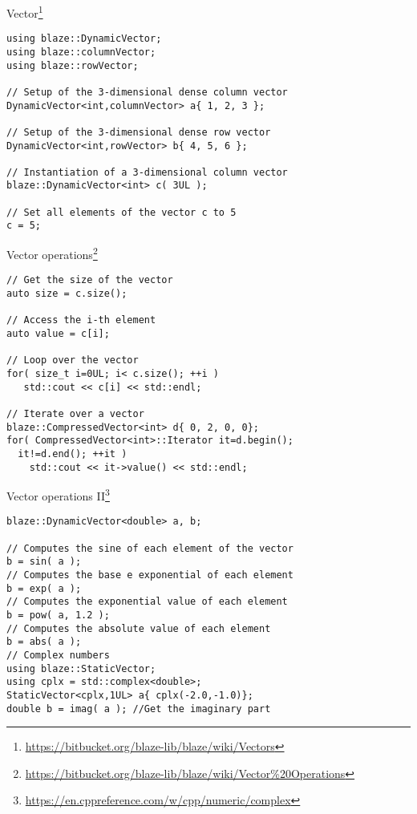 \documentclass[12pt,t]{beamer}
\begin{document}
\begin{frame}[fragile]{Vector\footnote{\tiny\url{https://bitbucket.org/blaze-lib/blaze/wiki/Vectors}}}
\begin{lstlisting}
using blaze::DynamicVector;
using blaze::columnVector;
using blaze::rowVector;

// Setup of the 3-dimensional dense column vector
DynamicVector<int,columnVector> a{ 1, 2, 3 };

// Setup of the 3-dimensional dense row vector
DynamicVector<int,rowVector> b{ 4, 5, 6 };

// Instantiation of a 3-dimensional column vector
blaze::DynamicVector<int> c( 3UL );

// Set all elements of the vector c to 5
c = 5;
\end{lstlisting}
\end{frame}

\begin{frame}[fragile]{Vector operations\footnote{\tiny\url{https://bitbucket.org/blaze-lib/blaze/wiki/Vector\%20Operations}}}
\begin{lstlisting}
// Get the size of the vector
auto size = c.size();

// Access the i-th element
auto value = c[i];

// Loop over the vector
for( size_t i=0UL; i< c.size(); ++i )
   std::cout << c[i] << std::endl;
   
// Iterate over a vector
blaze::CompressedVector<int> d{ 0, 2, 0, 0};
for( CompressedVector<int>::Iterator it=d.begin(); 
  it!=d.end(); ++it ) 
    std::cout << it->value() << std::endl;

\end{lstlisting}
\end{frame}

\begin{frame}[fragile]{Vector operations II\footnote{\tiny\url{https://en.cppreference.com/w/cpp/numeric/complex}}}
\begin{lstlisting}
blaze::DynamicVector<double> a, b;

// Computes the sine of each element of the vector
b = sin( a );  
// Computes the base e exponential of each element
b = exp( a ); 
// Computes the exponential value of each element
b = pow( a, 1.2 );   
// Computes the absolute value of each element
b = abs( a ); 
// Complex numbers
using blaze::StaticVector;
using cplx = std::complex<double>;
StaticVector<cplx,1UL> a{ cplx(-2.0,-1.0)};
double b = imag( a ); //Get the imaginary part 
\end{lstlisting}
\end{frame}
\end{document}
